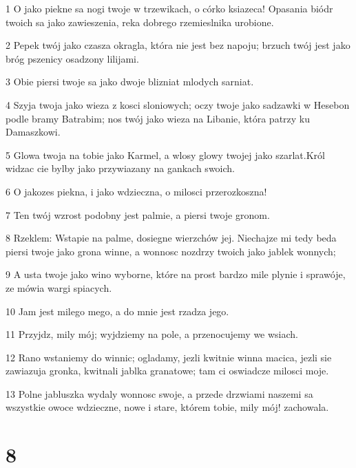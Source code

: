 \par 1 O jako piekne sa nogi twoje w trzewikach, o córko ksiazeca! Opasania biódr twoich sa jako zawieszenia, reka dobrego rzemieslnika urobione.
\par 2 Pepek twój jako czasza okragla, która nie jest bez napoju; brzuch twój jest jako bróg pszenicy osadzony lilijami.
\par 3 Obie piersi twoje sa jako dwoje blizniat mlodych sarniat.
\par 4 Szyja twoja jako wieza z kosci sloniowych; oczy twoje jako sadzawki w Hesebon podle bramy Batrabim; nos twój jako wieza na Libanie, która patrzy ku Damaszkowi.
\par 5 Glowa twoja na tobie jako Karmel, a wlosy glowy twojej jako szarlat.Król widzac cie bylby jako przywiazany na gankach swoich.
\par 6 O jakozes piekna, i jako wdzieczna, o milosci przerozkoszna!
\par 7 Ten twój wzrost podobny jest palmie, a piersi twoje gronom.
\par 8 Rzeklem: Wstapie na palme, dosiegne wierzchów jej. Niechajze mi tedy beda piersi twoje jako grona winne, a wonnosc nozdrzy twoich jako jablek wonnych;
\par 9 A usta twoje jako wino wyborne, które na prost bardzo mile plynie i sprawóje, ze mówia wargi spiacych.
\par 10 Jam jest milego mego, a do mnie jest rzadza jego.
\par 11 Przyjdz, mily mój; wyjdziemy na pole, a przenocujemy we wsiach.
\par 12 Rano wstaniemy do winnic; ogladamy, jezli kwitnie winna macica, jezli sie zawiazuja gronka, kwitnali jablka granatowe; tam ci oswiadcze milosci moje.
\par 13 Polne jabluszka wydaly wonnosc swoje, a przede drzwiami naszemi sa wszystkie owoce wdzieczne, nowe i stare, którem tobie, mily mój! zachowala.

\chapter{8}

